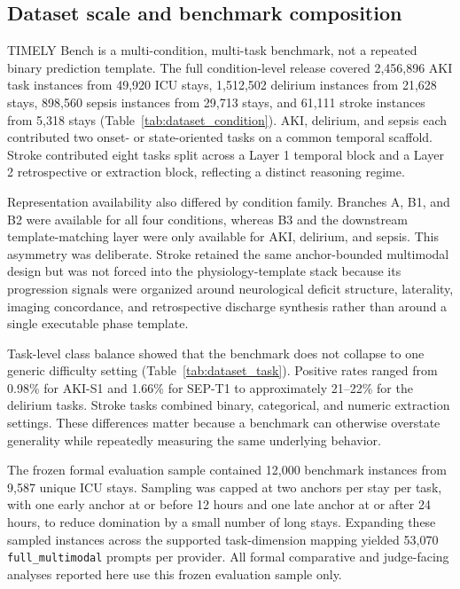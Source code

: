 \documentclass[pdflatex,sn-nature]{sn-jnl}
\begin{document}
\subsection{Dataset scale and benchmark composition}

TIMELY Bench is a multi-condition, multi-task benchmark, not a repeated binary prediction template. The full condition-level release covered 2,456,896 AKI task instances from 49,920 ICU stays, 1,512,502 delirium instances from 21,628 stays, 898,560 sepsis instances from 29,713 stays, and 61,111 stroke instances from 5,318 stays (Table~\ref{tab:dataset_condition}). AKI, delirium, and sepsis each contributed two onset- or state-oriented tasks on a common temporal scaffold. Stroke contributed eight tasks split across a Layer 1 temporal block and a Layer 2 retrospective or extraction block, reflecting a distinct reasoning regime.

Representation availability also differed by condition family. Branches A, B1, and B2 were available for all four conditions, whereas B3 and the downstream template-matching layer were only available for AKI, delirium, and sepsis. This asymmetry was deliberate. Stroke retained the same anchor-bounded multimodal design but was not forced into the physiology-template stack because its progression signals were organized around neurological deficit structure, laterality, imaging concordance, and retrospective discharge synthesis rather than around a single executable phase template.

Task-level class balance showed that the benchmark does not collapse to one generic difficulty setting (Table~\ref{tab:dataset_task}). Positive rates ranged from 0.98\% for AKI-S1 and 1.66\% for SEP-T1 to approximately 21--22\% for the delirium tasks. Stroke tasks combined binary, categorical, and numeric extraction settings. These differences matter because a benchmark can otherwise overstate generality while repeatedly measuring the same underlying behavior.

The frozen formal evaluation sample contained 12,000 benchmark instances from 9,587 unique ICU stays. Sampling was capped at two anchors per stay per task, with one early anchor at or before 12 hours and one late anchor at or after 24 hours, to reduce domination by a small number of long stays. Expanding these sampled instances across the supported task-dimension mapping yielded 53,070 \texttt{full\_multimodal} prompts per provider. All formal comparative and judge-facing analyses reported here use this frozen evaluation sample only.
\end{document}
